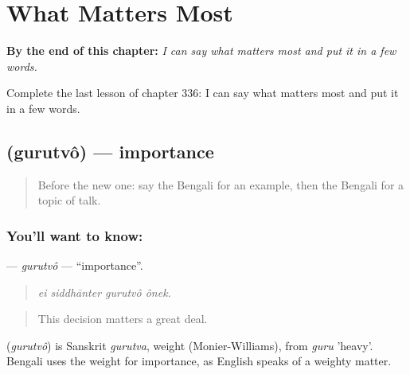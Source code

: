 
\chapter{What Matters Most}
\label{ch:bn-what-matters-most}

\begin{chapteropening}
\textbf{By the end of this chapter:} \emph{I can say what matters most and put it in a few words.}

Complete the last lesson of chapter 336: I can say what matters most and put it in a few words.
\end{chapteropening}

\section[\texorpdfstring{\bn{গুরুত্ব} (gurutvô)}{গুরুত্ব (gurutvô)}]{ (gurutvô) — importance}

\label{lesson:BN-C336-gurutvo}



\begin{quote}
Before the new one: say the Bengali for an example, then the Bengali for a topic of talk.
\end{quote}

\subsection*{You'll want to know: }
\textbf{} — \emph{gurutvô} — \textquotedblleft{}importance\textquotedblright{}.

\begin{quote}
   
\end{quote}

\begin{quote}
\emph{ei siddhānter gurutvô ônek.}
\end{quote}

\begin{quote}
This decision matters a great deal.
\end{quote}

\begin{cousinweb}
\textbf{} (\emph{gurutvô}) is Sanskrit \emph{gurutva}, weight (Monier-Williams), from \emph{guru} 'heavy'. Bengali uses the weight for importance, as English speaks of a weighty matter.
\end{cousinweb}

